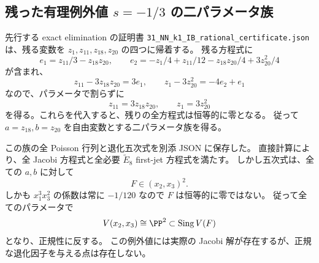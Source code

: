 \subsection{残った有理例外値 $s=-1/3$ の二パラメータ族}

先行する exact elimination の証明書
\texttt{31\_NN\_k1\_IB\_rational\_certificate.json} は、残る変数を
$z_1,z_{11},z_{18},z_{20}$ の四つに帰着する。
残る方程式に
\[
e_1=z_{11}/3-z_{18}z_{20},\qquad
e_2=-z_1/4+z_{11}/12-z_{18}z_{20}/4+3z_{20}^2/4
\]
が含まれ、
\[
z_{11}-3z_{18}z_{20}=3e_1,\qquad
z_1-3z_{20}^2=-4e_2+e_1
\]
なので、パラメータで割らずに
\[
z_{11}=3z_{18}z_{20},\qquad z_1=3z_{20}^2
\]
を得る。これらを代入すると、残りの全方程式は恒等的に零となる。
従って $a=z_{18},b=z_{20}$ を自由変数とする二パラメータ族を得る。

この族の全 Poisson 行列と退化五次式を別添 JSON に保存した。
直接計算により、全 Jacobi 方程式と全必要 $\widetilde E_8$ first-jet 方程式を満たす。
しかし五次式は、全ての $a,b$ に対して
\[
F\in(x_2,x_3)^2.
\]
しかも $x_1^3x_3^2$ の係数は常に $-1/120$ なので $F$ は恒等的に零ではない。
従って全てのパラメータで
\[
V(x_2,x_3)\cong\PP^2\subset\operatorname{Sing}V(F)
\]
となり、正規性に反する。
この例外値には実際の Jacobi 解が存在するが、正規な退化因子を与える点は存在しない。
